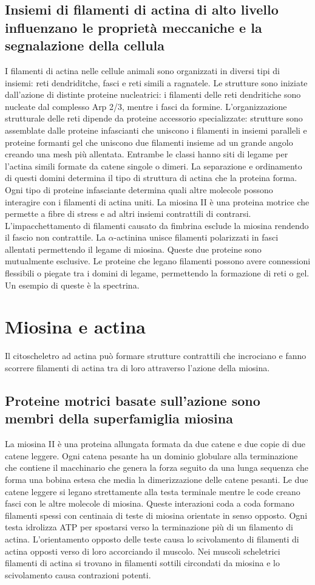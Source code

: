 \subsection{Insiemi di filamenti di actina di alto livello influenzano le propriet\`a meccaniche e la segnalazione della cellula}
I filamenti di actina nelle cellule animali sono organizzati in diversi tipi di insiemi: reti dendriditche, fasci e reti simili a ragnatele. Le strutture sono iniziate dall'azione
di distinte proteine nucleatrici: i filamenti delle reti dendritiche sono nucleate dal complesso Arp 2/3, mentre i fasci da formine. L'organizzazione strutturale delle reti dipende
da proteine accessorio specializzate: strutture sono assemblate dalle proteine infascianti che uniscono i filamenti in insiemi paralleli e proteine formanti gel che uniscono due 
filamenti insieme ad un grande angolo creando una mesh pi\`u allentata. Entrambe le classi hanno siti di legame per l'actina simili formate da catene singole o dimeri. La separazione
e ordinamento di questi domini determina il tipo di struttura di actina che la proteina forma. Ogni tipo di proteine infasciante determina quali altre molecole possono interagire con
i filamenti di actina uniti. La miosina II \`e una proteina motrice che permette a fibre di stress e ad altri insiemi contrattili di contrarsi. L'impacchettamento di filamenti causato
da fimbrina esclude la miosina rendendo il fascio non contrattile. La $\alpha$-actinina unisce filamenti polarizzati in fasci allentati permettendo il legame di miosina. Queste due 
proteine sono mutualmente esclusive. Le proteine che legano filamenti possono avere connessioni flessibili o piegate tra i domini di legame, permettendo la formazione di reti o gel. Un
esempio di queste \`e la spectrina. 
\section{Miosina e actina}
Il citoscheletro ad actina pu\`o formare strutture contrattili che incrociano e fanno scorrere filamenti di actina tra di loro attraverso l'azione della miosina.
\subsection{Proteine motrici basate sull'azione sono membri della superfamiglia miosina}
La miosina II \`e una proteina allungata formata da due catene e due copie di due catene leggere. Ogni catena pesante ha un dominio globulare alla terminazione  che contiene
il macchinario che genera la forza seguito da una lunga sequenza che forma una bobina estesa che media la dimerizzazione delle catene pesanti. Le due catene leggere si legano 
strettamente alla testa  terminale mentre le code creano fasci con le altre molecole di miosina. Queste interazioni coda a coda formano filamenti spessi con centinaia di teste
di miosina orientate in senso opposto. Ogni testa idrolizza ATP per spostarsi verso la terminazione pi\`u di un filamento di actina. L'orientamento opposto delle teste causa lo 
scivolamento di filamenti di actina opposti verso di loro accorciando il muscolo. Nei muscoli scheletrici filamenti di actina si trovano in filamenti sottili circondati da miosina e 
lo scivolamento causa contrazioni potenti.
